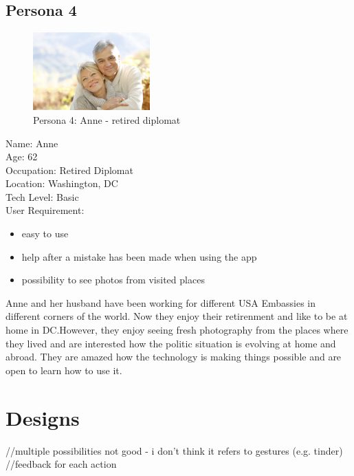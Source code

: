 \documentclass[version=last,fontsize=13pt]{scrartcl}
\begin{document}
\subsection{Persona 4}

\begin{figure}
	
	\centering
	\includegraphics[width = 0.4\textwidth]{imgs/Anne.jpg}
	\caption*{Persona 4: Anne - retired diplomat}

\end{figure}

\noindent
Name: Anne\\
Age:  62\\
Occupation: Retired Diplomat\\
Location: Washington, DC\\
Tech Level: Basic\\
User Requirement:
	\begin{itemize}
		\item easy to use 
		\item help after a mistake has been made when using the app 
		\item possibility to see photos from visited places
	\end{itemize}

	Anne and her husband have been working for different USA Embassies in different corners of the world. Now they enjoy their retirenment and like to be at home in DC.However, they enjoy seeing fresh photography from the places where they lived and are interested how the politic situation is evolving at home and abroad. They are amazed how the technology is making things possible and are open to learn how to use it.

\section{Designs}
//multiple possibilities not good - i don't think it refers to gestures (e.g. tinder) \\

//feedback for each action \\
\end{document}
